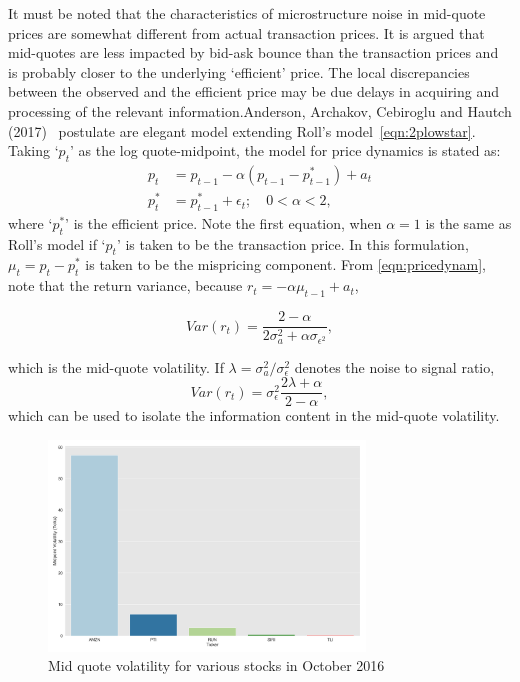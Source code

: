 It must be noted that the characteristics of microstructure noise in mid-quote prices are somewhat different from actual transaction prices. It is argued that mid-quotes are less impacted by bid-ask bounce than the transaction prices and is probably closer to the underlying `efficient' price. The local discrepancies between the observed and the efficient price may be due delays in acquiring and processing of the relevant information.Anderson, Archakov, Cebiroglu and Hautch (2017)~\cite{archcebha17} postulate are elegant model extending Roll's model~\ref{eqn:2plowstar}. Taking `$p_t$' as the log quote-midpoint, the model for price dynamics is stated as:
	\begin{equation}\label{eqn:pricedynam}	
	\begin{split}
	p_t&= p_{t-1} - \alpha (p_{t-1} - p_{t-1}^*) + a_t \\
	p_t^*&= p_{t-1}^* + \epsilon_t; \quad 0<\alpha<2,
	\end{split}
	\end{equation}
where `$p_t^*$' is the efficient price. Note the first equation, when $\alpha=1$ is the same as Roll's model if `$p_t$' is taken to be the transaction price. In this formulation, $\mu_t= p_t - p_t^*$ is taken to be the mispricing component. From \eqref{eqn:pricedynam}, note that the return variance, because $r_t= -\alpha \mu_{t-1} + a_t$,
	
	\begin{equation}
	Var(r_t)= \dfrac{2-\alpha}{2 \sigma_a^2 + \alpha \sigma_{\epsilon^2}},
	\end{equation}
	
which is the mid-quote volatility. If $\lambda= \sigma_a^2/\sigma_\epsilon^2$ denotes the noise to signal ratio,
	\begin{equation} \label{eqn:signalrationoise}
	Var(r_t)= \sigma_\epsilon^2  \dfrac{2\lambda + \alpha}{2-\alpha},
	\end{equation}
which can be used to isolate the information content in the mid-quote volatility. 


	\begin{figure}[!ht]
	\centering
	\includegraphics[width=0.75\textwidth]{chapters/chapter_trade_data_models/figures/mid_vol.png} 
	\caption{Mid quote volatility for various stocks in October 2016\label{fig:mid_vol}}
	\end{figure}


